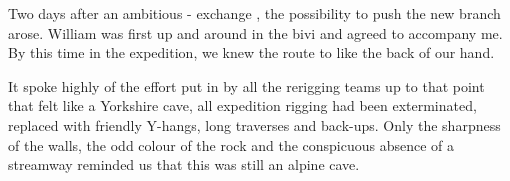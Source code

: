 Two days after an ambitious - exchange , the possibility to push the new branch arose. William was first up and around in the bivi and agreed to accompany me. By this time in the expedition, we knew the route to  like the back of our hand. 

It spoke highly of the effort put in by all the rerigging teams up to that point that  felt like a Yorkshire cave, all expedition rigging had been exterminated, replaced with friendly Y-hangs, long traverses and back-ups.  Only the sharpness of the walls, the odd colour of the rock and the conspicuous absence of a streamway reminded us that this was still an alpine cave.

\begin{marginsurvey}
	\checkoddpage \ifoddpage \forcerectofloat \else \forceversofloat \fi
	\centering

\end{marginsurvey}
